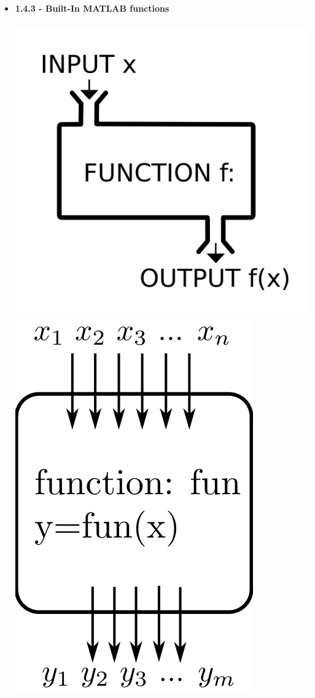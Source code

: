 \documentclass[11pt]{article}
\begin{document}
\begin{itemize}
\newpage
	\item \textbf{ \LARGE 1.4.3 -  Built-In MATLAB functions}\\\\
	 \includegraphics[scale=.15]{lecture2_fig1.png} \hspace{35mm}\includegraphics[scale=.30]{lecture2_fig2.png}\\\\  
		

\end{itemize}
\end{document}
